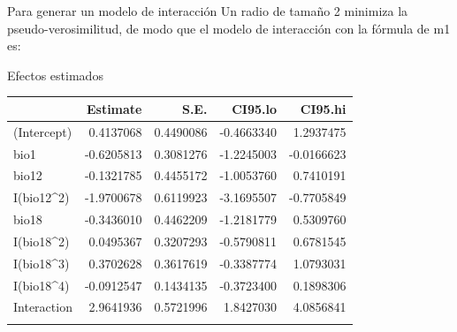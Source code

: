 \documentclass[
  11pt,
  ignorenonframetext,
]{beamer}
\newenvironment{Shaded}{}{}
\newcommand{\AttributeTok}[1]{\textcolor[rgb]{0.49,0.56,0.16}{#1}}
\newcommand{\CommentTok}[1]{\textcolor[rgb]{0.38,0.63,0.69}{\textit{#1}}}
\newcommand{\DecValTok}[1]{\textcolor[rgb]{0.25,0.63,0.44}{#1}}
\newcommand{\FloatTok}[1]{\textcolor[rgb]{0.25,0.63,0.44}{#1}}
\newcommand{\FunctionTok}[1]{\textcolor[rgb]{0.02,0.16,0.49}{#1}}
\newcommand{\NormalTok}[1]{#1}
\newcommand{\OtherTok}[1]{\textcolor[rgb]{0.00,0.44,0.13}{#1}}
\newcommand{\SpecialCharTok}[1]{\textcolor[rgb]{0.25,0.44,0.63}{#1}}
\begin{document}
\begin{frame}[fragile]{Para generar un modelo de interacción}
\protect\hypertarget{para-generar-un-modelo-de-interacciuxf3n-2}{}
Un radio de tamaño 2 minimiza la pseudo-verosimilitud, de modo que el
modelo de interacción con la fórmula de m1 es:

\begin{Shaded}
\end{Shaded}
\end{frame}

\begin{frame}{Efectos estimados}
\protect\hypertarget{efectos-estimados}{}
\begin{longtable}[]{@{}lrrrr@{}}
\toprule\noalign{}
& Estimate & S.E. & CI95.lo & CI95.hi \\
\midrule\noalign{}
\endhead
(Intercept) & 0.4137068 & 0.4490086 & -0.4663340 & 1.2937475 \\
bio1 & -0.6205813 & 0.3081276 & -1.2245003 & -0.0166623 \\
bio12 & -0.1321785 & 0.4455172 & -1.0053760 & 0.7410191 \\
I(bio12\^{}2) & -1.9700678 & 0.6119923 & -3.1695507 & -0.7705849 \\
bio18 & -0.3436010 & 0.4462209 & -1.2181779 & 0.5309760 \\
I(bio18\^{}2) & 0.0495367 & 0.3207293 & -0.5790811 & 0.6781545 \\
I(bio18\^{}3) & 0.3702628 & 0.3617619 & -0.3387774 & 1.0793031 \\
I(bio18\^{}4) & -0.0912547 & 0.1434135 & -0.3723400 & 0.1898306 \\
Interaction & 2.9641936 & 0.5721996 & 1.8427030 & 4.0856841 \\
\bottomrule\noalign{}
\end{longtable}
\end{frame}
\end{document}
